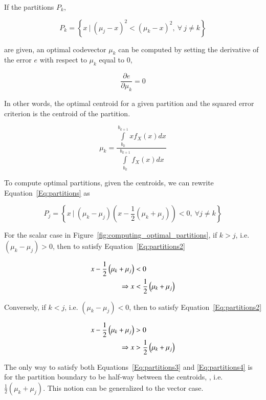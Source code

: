If the partitions $P_k$,

\begin{equation}
\label{Eq:partitions}
P_k =  \left\{x \ | \ (\mu_j-x)^2 < (\mu_k-x)^2, \ \forall \ j \neq k \right\}
\end{equation}

are given, an optimal codevector $\mu_k$ can be computed by setting the derivative of the error $e$ with respect to $\mu_k$ equal to 0,

\begin{equation}
\frac{\partial{e}}{\partial{\mu_k}} = 0
\end{equation}

In other words, the optimal centroid for a given partition and the squared error criterion is the centroid of the partition. 

\begin{equation}
\mu_k = \frac
{\int\limits_{b_k}^{b_{k+1}}xf_X(x)dx}
{\int\limits_{b_k}^{b_{k+1}}f_X(x)dx}
\end{equation}

To compute optimal partitions, given the centroids, we can rewrite Equation~\ref{Eq:partitions} as 

\begin{equation}
\label{Eq:partitions2}
P_j=\left\{x \ | \ (\mu_k -\mu_j) \left(x - \frac{1}{2} \left(\mu_k + \mu_j \right)\right) < 0, \ \forall j \neq k 
\right\}
\end{equation}

For the scalar case in Figure~\ref{fig:computing_optimal_partitions}, if $k>j$, i.e. $(\mu_k -\mu_j) > 0$, then to satisfy Equation~\ref{Eq:partitions2}

\begin{align}
\label{Eq:partitions3}
x - \frac{1}{2} \left(\mu_k + \mu_j \right) &< 0\notag\\
\Rightarrow x &< \frac{1}{2} \left(\mu_k + \mu_j \right)
\end{align}

Conversely, if $k<j$, i.e. $(\mu_k -\mu_j) < 0$, then to satisfy Equation~\ref{Eq:partitions2}

\begin{align}
\label{Eq:partitions4}
x - \frac{1}{2} \left(\mu_k + \mu_j \right) &> 0 \notag\\
\Rightarrow x &> \frac{1}{2} \left(\mu_k + \mu_j \right)
\end{align}

The only way to satisfy both Equations~\ref{Eq:partitions3} and \ref{Eq:partitions4} is for the partition boundary to be half-way between the centroids, , i.e. $\frac{1}{2} \left(\mu_k + \mu_j \right)$.  This notion can be generalized to the vector case.

